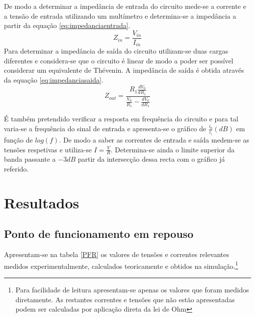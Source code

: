 \documentclass[%
  reprint,
  nofootinbib,
  amsmath,amssymb,
  aps,
  10pt,
  a4paper
]{revtex4-1}
\begin{document}
De modo a determinar a impedância de entrada do circuito mede-se a corrente e a tensão de entrada utilizando um multímetro e determina-se a impedância a partir da equação \ref{eq:impedanciaentrada}.
\begin{equation}
Z_{in}=\frac{V_{in}}{I_{in}}
\label{eq:impedanciaentrada}
\end{equation}
Para determinar a impedância de saída do circuito utilizam-se duas cargas diferentes e considera-se que o circuito é linear de modo a poder ser possível considerar um equivalente de Thévenin. A impedância de saída é obtida através da equação \ref{eq:impedanciasaida}.
\begin{equation}
Z_{out}=\frac{R_1 \frac{dV_0}{dR_1}}{\frac{V_0}{R_1}-\frac{dV_0}{dR_1}}
\label{eq:impedanciasaida}
\end{equation}

É também pretendido verificar a resposta em frequência do circuito e para tal varia-se a frequência do sinal de entrada e apresenta-se o gráfico de $\frac{i_0}{i_i} (dB)$ em função de $log(f)$. De modo a saber as correntes de entrada e saída medem-se as tensões respetivas e utiliza-se $I=\frac{V}{R}$. Determina-se ainda o limite superior da banda passante a $-3dB$ partir da intersecção dessa recta com o gráfico já referido. 



\section{Resultados}
\label{s:resul}


\subsection{Ponto de funcionamento em repouso}
Apresentam-se na tabela \ref{PFR} os valores de tensões e correntes relevantes medidos experimentalmente, calculados teoricamente e obtidos na simulação.\footnote{Para facilidade de leitura apresentam-se apenas os valores que foram medidos diretamente. As restantes correntes e tensões que não estão apresentadas podem ser calculadas por aplicação direta da lei de Ohm}
\end{document}
